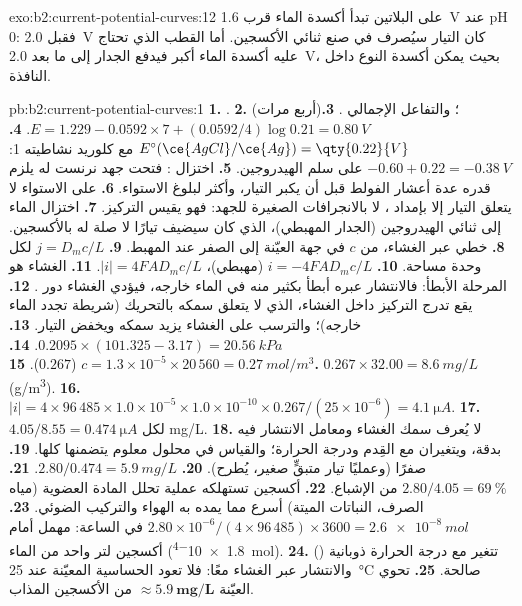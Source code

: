 \begin{solution}{exo:b2:current-potential-curves:12}
على البلاتين تبدأ أكسدة الماء قرب \qty{1.6}{V} عند pH 0: فقبل
\qty{2.0}{V} كان التيار سيُصرف في صنع ثنائي الأكسجين. أما القطب الذي
تحتاج عليه أكسدة الماء  أكبر فيدفع الجدار إلى ما بعد
\qty{2.0}{V}، بحيث يمكن أكسدة النوع داخل النافذة.
\end{solution}

\begin{solution}{pb:b2:current-potential-curves:1}
\textbf{1.} .
\textbf{2.}  (أربع مرات)؛ والتفاعل الإجمالي .
\textbf{3.} $E = 1.229 - 0.0592 \times 7 + (0.0592/4)\log 0.21 = \qty{0.80}{V}$.
\textbf{4.} $E^\circ(\ce{AgCl}/\ce{Ag}) = \qty{0.22}{V}$ مع كلوريد نشاطيته 1:
$-0.60 + 0.22 = \qty{-0.38}{V}$ على سلم الهيدروجين.
\textbf{5.} اختزال  : فتحت جهد نرنست له
يلزم  قدره عدة أعشار الفولط قبل أن يكبر التيار،
وأكثر لبلوغ الاستواء.
\textbf{6.} على الاستواء لا يتعلق التيار إلا بإمداد ،
لا بالانجرافات الصغيرة للجهد: فهو يقيس التركيز.
\textbf{7.} اختزال الماء إلى ثنائي الهيدروجين (الجدار المهبطي)، الذي كان
سيضيف تيارًا لا صلة له بالأكسجين.
\textbf{8.} خطي عبر الغشاء، من $c$ في جهة العيّنة إلى الصفر عند
المهبط.
\textbf{9.} $j = D_m c/L$ لكل وحدة مساحة.
\textbf{10.} $i = -4FAD_m c/L$ (مهبطي)، $|i| = 4FAD_mc/L$.
\textbf{11.} الغشاء هو المرحلة الأبطأ: فالانتشار عبره أبطأ بكثير
منه في الماء خارجه، فيؤدي الغشاء دور .
\textbf{12.} يقع تدرج التركيز داخل الغشاء، الذي لا يتعلق سمكه
بالتحريك (شريطة تجدد الماء خارجه)؛
والترسب على الغشاء يزيد سمكه ويخفض التيار.
\textbf{13.} $0.2095 \times (101.325 - 3.17) = \qty{20.56}{kPa}$.
\textbf{14.} $c = 1.3 \times 10^{-5} \times 20\,560 = \qty{0.27}{mol/m^3}$ ($0.267$).
\textbf{15.} $0.267 \times 32.00 = \qty{8.6}{mg/L}$ (\unit{g/m^3}).
\textbf{16.} $|i| = 4 \times 96\,485 \times 1.0 \times 10^{-5} \times 1.0 \times 10^{-10}
\times 0.267/(25 \times 10^{-6}) = \qty{4.1}{\micro A}$.
\textbf{17.} $4.05/8.55 = \qty{0.474}{\micro A}$ لكل \unit{mg/L}.
\textbf{18.} لا يُعرف سمك الغشاء ومعامل الانتشار فيه بدقة،
ويتغيران مع القِدم ودرجة الحرارة؛ والقياس في محلول معلوم
يتضمنها كلها.
\textbf{19.} صفرًا (وعمليًا تيار متبقٍّ صغير، يُطرح).
\textbf{20.} $2.80/0.474 = \qty{5.9}{mg/L}$.
\textbf{21.} $2.80/4.05 = 69~\%$ من الإشباع.
\textbf{22.} أكسجين تستهلكه عملية تحلل المادة العضوية (مياه الصرف، النباتات الميتة)
أسرع مما يمده به الهواء والتركيب الضوئي.
\textbf{23.} $2.80 \times 10^{-6}/(4 \times 96\,485) \times 3600 = \qty{2.6e-8}{mol}$
في الساعة: مهمل أمام أكسجين لتر واحد من الماء
(\qty{1.8e-4}{mol}).
\textbf{24.} تتغير مع درجة الحرارة ذوبانية  () والانتشار
عبر الغشاء معًا: فلا تعود الحساسية المعيّنة عند
\qty{25}{\degreeCelsius} صالحة.
\textbf{25.} تحوي العيّنة $\boldsymbol{\approx \qty{5.9}{mg/L}}$ من الأكسجين
المذاب.
\end{solution}
